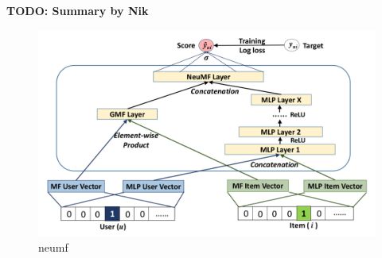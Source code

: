 \textbf{TODO: Summary by Nik}

\begin{figure}[t]
    \includegraphics[width=\linewidth]{images/neumf.png}
    \caption{neumf}
    \label{fig:neumf}
\end{figure}

